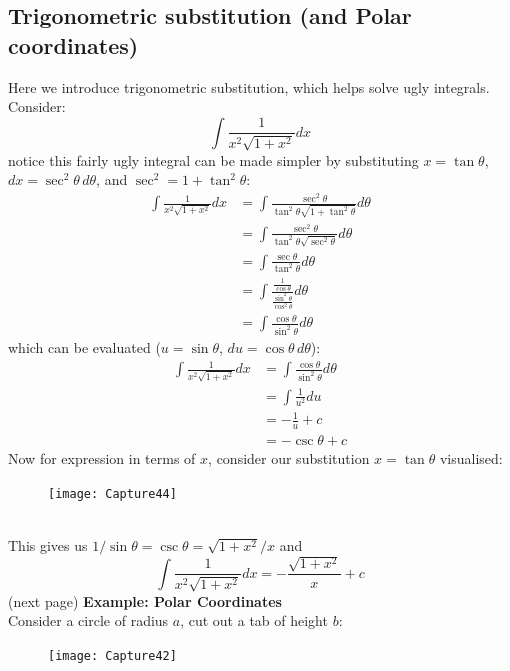 \documentclass{report}
\begin{document}
\subsection{Trigonometric substitution (and Polar coordinates)} %
Here we introduce trigonometric substitution, which helps solve ugly integrals. Consider:
\begin{equation*}
\int\frac{1}{x^2\sqrt{1+x^2}}dx
\end{equation*}
notice this fairly ugly integral can be made simpler by substituting 
$x=\tan\theta$, $dx=\sec^2\theta\,d\theta$, and $\sec^2=1+\tan^2\theta$:
\begin{align*}
\int\frac{1}{x^2\sqrt{1+x^2}}dx
&=\int\frac{\sec^2\theta}{\tan^2\theta\sqrt{1+\tan^2\theta}}d\theta\\
&=\int\frac{\sec^2\theta}{\tan^2\theta\sqrt{\sec^2\theta}}d\theta\\
&=\int\frac{\sec\theta}{\tan^2\theta}d\theta\\
&=\int\frac{\frac{1}{\cos\theta}}{\frac{\sin^2\theta}{\cos^2\theta}}d\theta\\
&=\int\frac{\cos\theta}{\sin^2\theta}d\theta
\end{align*}
which can be evaluated ($u=\sin\theta$, $du=\cos\theta\,d\theta$):
\begin{align*}
\int\frac{1}{x^2\sqrt{1+x^2}}dx&=\int\frac{\cos\theta}{\sin^2\theta}d\theta\\
&=\int\frac{1}{u^2}du\\
&=-\frac{1}{u}+c\\
&=-\csc\theta+c
\end{align*}
Now for expression in terms of $x$, consider our substitution
$x=\tan\theta$ visualised:
\begin{figure}[h]
\texttt{[image: Capture44]}\\
\centering
{}
\end{figure}\\
This gives us $1/\sin\theta=\csc\theta=\sqrt{1+x^2}/x$ and
\begin{equation*}
\int\frac{1}{x^2\sqrt{1+x^2}}dx=-\frac{\sqrt{1+x^2}}{x}+c
\end{equation*}
(next page)
\newpage
\noindent\textbf{Example: Polar Coordinates}\\
Consider a circle of radius $a$, cut out a tab of height $b$:
\begin{figure}[h]
\texttt{[image: Capture42]}\\
\centering
{} 
\end{figure}\\
\end{document}
